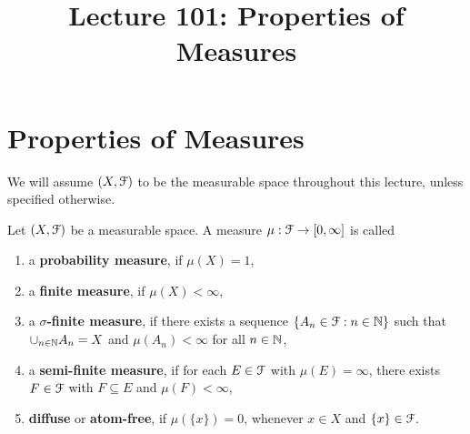 \documentclass[a4paper,english,12pt]{article}
\title{Lecture 101: Properties of Measures}
\author{}
\begin{document}
\maketitle

\section{Properties of Measures}
We will assume $(X, \mathcal{F})$ to be the measurable space throughout this lecture, unless specified otherwise.
\begin{defn} Let $(X, \mathcal{F})$ be a measurable space. A measure $\mu: \mathcal{F} \to [0, \infty]$ is called 
\begin{enumerate}
	\item a \textbf{probability measure}, if $\mu(X) = 1$,
	\item a \textbf{finite measure}, if $\mu(X) < \infty$,
	\item a \textbf{$\sigma$-finite measure}, if there exists a sequence $\{A_n \in \mathcal{F}: n \in \mathbb{N}\}$ such that $\cup_{n \in \mathbb{N}}A_n = X$ and $\mu(A_n) < \infty$ for all $n \in \mathbb{N}$,
	\item a \textbf{semi-finite measure}, if for each $E \in \mathcal{F}$ with $\mu(E) = \infty$, there exists $F \in \mathcal{F}$ with $F \subseteq E$ and $\mu(F) < \infty$,
	\item \textbf{diffuse} or \textbf{atom-free}, if $\mu(\{x\}) = 0$, whenever $x \in X$ and $\{x\} \in \mathcal{F}$.
\end{enumerate}
\end{defn}
\end{document}
